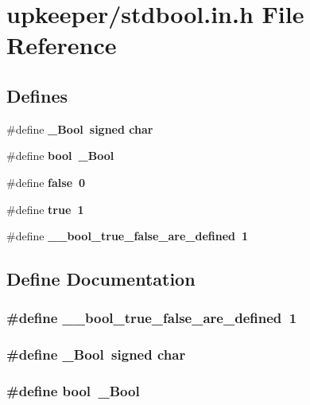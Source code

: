 \section{upkeeper/stdbool.in.h File Reference}
\label{stdbool_8in_8h}
\subsection*{Defines}
\begin{CompactItemize}
\item 
\#define \bf{\_\-Bool}~signed char
\item 
\#define \bf{bool}~\_\-Bool
\item 
\#define \bf{false}~0
\item 
\#define \bf{true}~1
\item 
\#define \bf{\_\-\_\-bool\_\-true\_\-false\_\-are\_\-defined}~1
\end{CompactItemize}


\subsection{Define Documentation}
\subsubsection{\setlength{\rightskip}{0pt plus 5cm}\#define \_\-\_\-bool\_\-true\_\-false\_\-are\_\-defined~1}\label{stdbool_8in_8h_7368c717d98b2d5f8470cd28ccbfc650}


\subsubsection{\setlength{\rightskip}{0pt plus 5cm}\#define \_\-Bool~signed char}\label{stdbool_8in_8h_2d8af1d76341241523611549cb949e73}


\subsubsection{\setlength{\rightskip}{0pt plus 5cm}\#define bool~\_\-Bool}\label{stdbool_8in_8h_56cb927c52cc788aea18665319b8ee1c}


